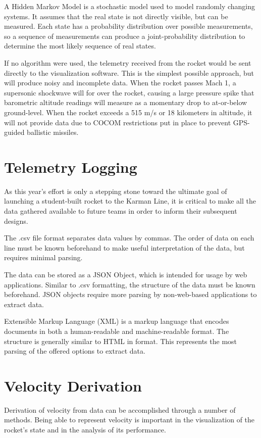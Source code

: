 \documentclass[onecolumn, draftclsnofoot,10pt, compsoc]{IEEEtran}
\begin{document}
		\noindent
		A Hidden Markov Model is a stochastic model used to model randomly changing systems.
		It assumes that the real state is not directly visible, but can be measured.
		Each state has a probability distribution over possible measurements, so a sequence of measurements can produce a joint-probability distribution to determine the most likely sequence of real states.
	
		\noindent
		If no algorithm were used, the telemetry received from the rocket would be sent directly to the visualization software.
		This is the simplest possible approach, but will produce noisy and incomplete data.
		When the rocket passes Mach 1, a supersonic shockwave will for over the rocket, causing a large pressure spike that barometric altitude readings will measure as a momentary drop to at-or-below ground-level.
		When the rocket exceeds a 515 m/s or 18 kilometers in altitude\cite{COCOM}, it will not provide data due to COCOM restrictions put in place to prevent GPS-guided ballistic missiles.
		
	\section{Telemetry Logging}
		\noindent
		As this year's effort is only a stepping stone toward the ultimate goal of launching a student-built rocket to the Karman Line, it is critical to make all the data gathered available to future teams in order to inform their subsequent designs.
		
		
		\noindent
		The .csv file format separates data values by commas.
		The order of data on each line must be known beforehand to make useful interpretation of the data, but requires minimal parsing.

		\noindent
		The data can be stored as a JSON Object, which is intended for usage by web applications.
		Similar to .csv formatting, the structure of the data must be known beforehand.
		JSON objects require more parsing by non-web-based applications to extract data.
			
		\noindent
		Extensible Markup Language (XML) is a markup language that encodes documents in both a human-readable and machine-readable format.
		The structure is generally similar to HTML in format.
		This represents the most parsing of the offered options to extract data.

	\section{Velocity Derivation}
		Derivation of velocity from data can be accomplished through a number of methods.
		Being able to represent velocity is important in the visualization of the rocket's state and in the analysis of its performance.
		
\end{document}
